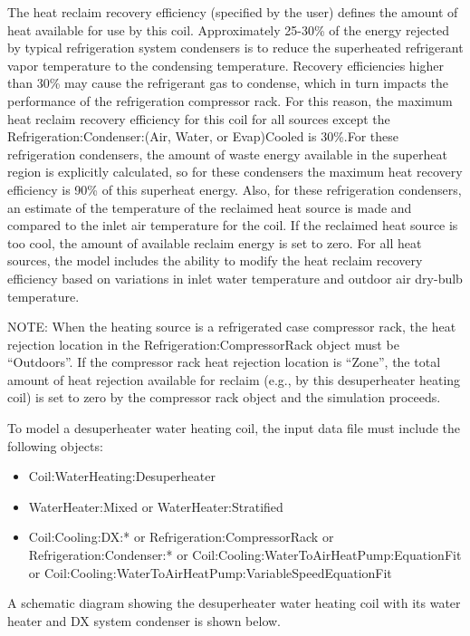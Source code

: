 The heat reclaim recovery efficiency (specified by the user) defines the amount of heat available for use by this coil. Approximately 25-30\% of the energy rejected by typical refrigeration system condensers is to reduce the superheated refrigerant vapor temperature to the condensing temperature. Recovery efficiencies higher than 30\% may cause the refrigerant gas to condense, which in turn impacts the performance of the refrigeration compressor rack. For this reason, the maximum heat reclaim recovery efficiency for this coil for all sources except the Refrigeration:Condenser:(Air, Water, or Evap)Cooled is 30\%.For these refrigeration condensers, the amount of waste energy available in the superheat region is explicitly calculated, so for these condensers the maximum heat recovery efficiency is 90\% of this superheat energy. Also, for these refrigeration condensers, an estimate of the temperature of the reclaimed heat source is made and compared to the inlet air temperature for the coil. If the reclaimed heat source is too cool, the amount of available reclaim energy is set to zero. For all heat sources, the model includes the ability to modify the heat reclaim recovery efficiency based on variations in inlet water temperature and outdoor air dry-bulb temperature.

NOTE: When the heating source is a refrigerated case compressor rack, the heat rejection location in the Refrigeration:CompressorRack object must be ``Outdoors''. If the compressor rack heat rejection location is ``Zone'', the total amount of heat rejection available for reclaim (e.g., by this desuperheater heating coil) is set to zero by the compressor rack object and the simulation proceeds.

To model a desuperheater water heating coil, the input data file must include the following objects:

\begin{itemize}
\item Coil:WaterHeating:Desuperheater
\item WaterHeater:Mixed or WaterHeater:Stratified
\item Coil:Cooling:DX:* or Refrigeration:CompressorRack or Refrigeration:Condenser:* or Coil:Cooling:WaterToAirHeatPump:EquationFit or Coil:Cooling:WaterToAirHeatPump:VariableSpeedEquationFit
\end{itemize}

A schematic diagram showing the desuperheater water heating coil with its water heater and DX system condenser is shown below.

